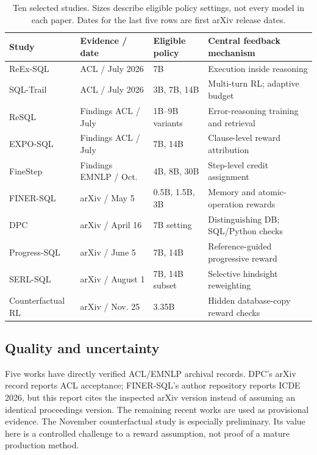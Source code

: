 \documentclass[11pt,a4paper]{article}
\begin{document}
\begin{table}[h]
\centering\small
\begin{tabularx}{\textwidth}{@{}p{23mm}p{26mm}p{23mm}Y@{}}
\toprule
Study & Evidence / date & Eligible policy & Central feedback mechanism\\
\midrule
ReEx-SQL \cite{reex} & ACL / July 2026 & 7B & Execution inside reasoning\\
SQL-Trail \cite{trail} & ACL / July 2026 & 3B, 7B, 14B & Multi-turn RL; adaptive budget\\
ReSQL \cite{resql} & Findings ACL / July & 1B--9B variants & Error-reasoning training and retrieval\\
EXPO-SQL \cite{expo} & Findings ACL / July & 7B, 14B & Clause-level reward attribution\\
FineStep \cite{finestep} & Findings EMNLP / Oct. & 4B, 8B, 30B & Step-level credit assignment\\
FINER-SQL \cite{finer} & arXiv / May 5 & 0.5B, 1.5B, 3B & Memory and atomic-operation rewards\\
DPC \cite{dpc} & arXiv / April 16 & 7B setting & Distinguishing DB; SQL/Python checks\\
Progress-SQL \cite{progress} & arXiv / June 5 & 7B, 14B & Reference-guided progressive reward\\
SERL-SQL \cite{serl} & arXiv / August 1 & 7B, 14B subset & Selective hindsight reweighting\\
Counterfactual RL \cite{counter} & arXiv / Nov. 25 & 3.35B & Hidden database-copy reward checks\\
\bottomrule
\end{tabularx}
\caption{Ten selected studies. Sizes describe eligible policy settings, not every model in each paper. Dates for the last five rows are first arXiv release dates.}
\end{table}

\subsection{Quality and uncertainty}
Five works have directly verified ACL/EMNLP archival records. DPC's arXiv record reports ACL acceptance; FINER-SQL's author repository reports ICDE 2026, but this report cites the inspected arXiv version instead of assuming an identical proceedings version. The remaining recent works are used as provisional evidence. The November counterfactual study is especially preliminary. Its value here is a controlled challenge to a reward assumption, not proof of a mature production method.
\end{document}
